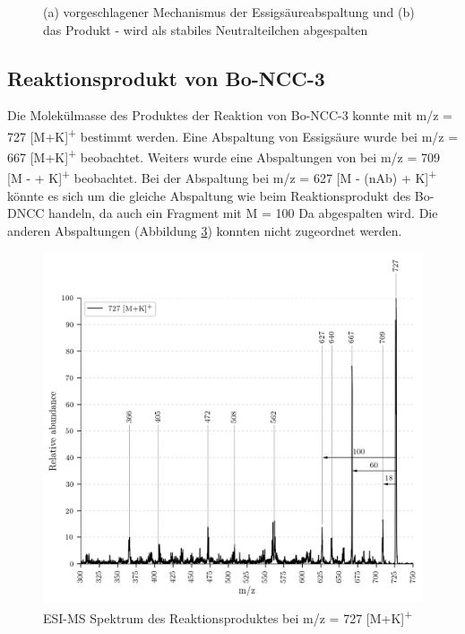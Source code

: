 \begin{figure}[!htbp]
\begin{subfigure}[b]{0.5\textwidth}
    \caption{}
    \label{fig:699MK639}
  \end{subfigure}
  \caption[Vorschlag des Mechanismus der  Abspaltung, Quelle: Author]{(a) vorgeschlagener Mechanismus der Essigsäureabspaltung und (b) das Produkt -  wird als stabiles Neutralteilchen abgespalten}
\end{figure}



\pagebreak
\subsection{Reaktionsprodukt von Bo-NCC-3}

Die Molekülmasse des Produktes der Reaktion von Bo-NCC-3 konnte mit m/z = 727 [M+K]\textsuperscript{+} bestimmt werden. Eine Abspaltung von Essigsäure wurde bei m/z = 667 [M+K]\textsuperscript{+} beobachtet. Weiters wurde eine Abspaltungen von  bei m/z = 709 [M -  + K]\textsuperscript{+} beobachtet. Bei der Abspaltung bei m/z = 627 [M - (\gls{nAb}) + K]\textsuperscript{+} könnte es sich um die gleiche Abspaltung wie beim Reaktionsprodukt des Bo-DNCC handeln, da auch ein Fragment mit M = 100 Da abgespalten wird. Die anderen Abspaltungen (Abbildung \ref{fig:727MKLeafspray}) konnten nicht zugeordnet werden.

\begin{figure}[!htbp]
  \centering
  \includegraphics[width=\textwidth, height=0.7\textwidth]{figures/Kapitel4/Kataboliten/VWA_MS_LeafSpray_727.png}
  \caption[ESI-MS des Reaktionsproduktes von Bo-NCC-3, Quelle: Author]{ESI-MS Spektrum des Reaktionsproduktes bei m/z = 727 [M+K]\textsuperscript{+}}
  \label{fig:727MKLeafspray}
\end{figure}

